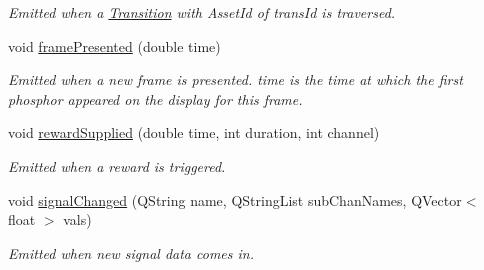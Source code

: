 \begin{DoxyCompactItemize}
\begin{DoxyCompactList}\small\item\em Emitted when a \hyperlink{class_picto_1_1_transition}{Transition} with Asset\-Id of trans\-Id is traversed. \end{DoxyCompactList}\item 
\hypertarget{class_picto_1_1_remote_state_updater_a89ac8bb7890ae00972bfd16259dd33aa}{void \hyperlink{class_picto_1_1_remote_state_updater_a89ac8bb7890ae00972bfd16259dd33aa}{frame\-Presented} (double time)}\label{class_picto_1_1_remote_state_updater_a89ac8bb7890ae00972bfd16259dd33aa}

\begin{DoxyCompactList}\small\item\em Emitted when a new frame is presented. time is the time at which the first phosphor appeared on the display for this frame. \end{DoxyCompactList}\item 
void \hyperlink{class_picto_1_1_remote_state_updater_a903965eb87c3ddd006ea391c724df25f}{reward\-Supplied} (double time, int duration, int channel)
\begin{DoxyCompactList}\small\item\em Emitted when a reward is triggered. \end{DoxyCompactList}\item 
void \hyperlink{class_picto_1_1_remote_state_updater_a6034fb211d601078c6c9c59b78e10496}{signal\-Changed} (Q\-String name, Q\-String\-List sub\-Chan\-Names, Q\-Vector$<$ float $>$ vals)
\begin{DoxyCompactList}\small\item\em Emitted when new signal data comes in. \end{DoxyCompactList}\end{DoxyCompactItemize}
